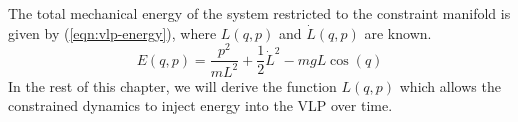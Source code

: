 The total mechanical energy of the system restricted to the constraint manifold
is given by (\ref{eqn:vlp-energy}), where \(L(q,p)\) and \(\dot{L}(q,p)\) are
known.
\begin{equation}\label{eqn:vlp-energy}
   E(q,p) = \frac{p^2}{mL^2} + \frac{1}{2}\dot{L}^2 - mgL\cos(q)
\end{equation}
In the rest of this chapter, we will derive the function \(L(q,p)\) which
allows the constrained dynamics to inject energy into the VLP over time.


